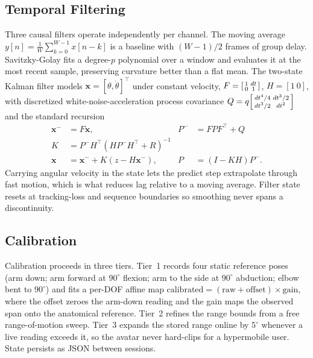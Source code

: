 \documentclass[conference]{IEEEtran}
\begin{document}
\subsection{Temporal Filtering}
\label{sec:filtering}
Three causal filters operate independently per channel. The moving
average $y[n]=\frac1W\sum_{k=0}^{W-1}x[n-k]$ is a baseline with
$(W\!-\!1)/2$ frames of group delay. Savitzky-Golay
\cite{savitzky1964smoothing} fits a degree-$p$ polynomial over a window
and evaluates it at the most recent sample, preserving curvature better
than a flat mean. The two-state Kalman filter models
$\mathbf{x}=[\theta,\dot\theta]^{\!\top}$ under constant velocity,
$F=\begin{bsmallmatrix}1&dt\\0&1\end{bsmallmatrix}$, $H=[1\ 0]$, with
discretized white-noise-acceleration process covariance
$Q = q\begin{bsmallmatrix}dt^4/4 & dt^3/2\\ dt^3/2 & dt^2\end{bsmallmatrix}$
and the standard recursion
\begin{align}
\mathbf{x}^- &= F\mathbf{x}, & P^- &= FPF^{\!\top}+Q \\
K &= P^-H^{\!\top}(HP^-H^{\!\top}+R)^{-1} \\
\mathbf{x} &= \mathbf{x}^- + K(z-H\mathbf{x}^-), & P &= (I-KH)P^-.
\end{align}
Carrying angular velocity in the state lets the predict step extrapolate
through fast motion, which is what reduces lag relative to a moving
average. Filter state resets at tracking-loss and sequence boundaries so
smoothing never spans a discontinuity.

\subsection{Calibration}
\label{sec:calibration}
Calibration proceeds in three tiers. Tier~1 records four static
reference poses (arm down; arm forward at $90^\circ$ flexion; arm to the
side at $90^\circ$ abduction; elbow bent to $90^\circ$) and fits a
per-DOF affine map
$\text{calibrated} = (\text{raw} + \text{offset})\times\text{gain}$,
where the offset zeroes the arm-down reading and the gain maps the
observed span onto the anatomical reference. Tier~2 refines the range
bounds from a free range-of-motion sweep. Tier~3 expands the stored range
online by $5^\circ$ whenever a live reading exceeds it, so the avatar
never hard-clips for a hypermobile user. State persists as JSON between
sessions.
\end{document}
